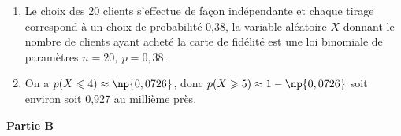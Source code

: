 \begin{enumerate}


	\begin{enumerate}
		\item %
	Le choix des 20 clients s'effectue de façon indépendante  et chaque tirage correspond à un choix de probabilité 0,38, la variable aléatoire $X$ donnant le nombre de clients ayant acheté la carte de fidélité est une loi binomiale de paramètres $n = 20, \:p = 0,38$.
		\item %
		On a $p(X \leqslant 4) \approx \np{0,0726}$, donc $p(X \geqslant 5) \approx 1 - \np{0,0726}$ soit environ  soit 0,927 au millième près.
	\end{enumerate}
\end{enumerate}

\medskip

\textbf{Partie B}

\medskip

%
%
%
%
%
%

